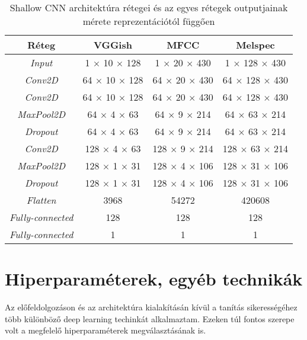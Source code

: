 \begin{table}[H]
	\centering
	\begin{tabular}{ | c | c | c | c |}
		\hline
		\textbf{Réteg} & \textbf{VGGish} & \textbf{MFCC} & \textbf{Melspec}  \\
		\hline \hline
		\emph{Input} & 1 $\times$ 10 $\times$ 128 & 1 $\times$ 20 $\times$ 430 & 1 $\times$ 128 $\times$ 430 \\
		\hline
		\emph{Conv2D} & 64 $\times$ 10 $\times$ 128 & 64 $\times$ 20 $\times$ 430 & 64 $\times$ 128 $\times$ 430 \\
		\hline
		\emph{Conv2D} & 64 $\times$ 10 $\times$ 128 & 64 $\times$ 20 $\times$ 430 & 64 $\times$ 128 $\times$ 430 \\
		\hline
		\emph{MaxPool2D} & 64 $\times$ 4 $\times$ 63 & 64 $\times$ 9 $\times$ 214 & 64 $\times$ 63 $\times$ 214 \\
		\hline
		\emph{Dropout} & 64 $\times$ 4 $\times$ 63 & 64 $\times$ 9 $\times$ 214 & 64 $\times$ 63 $\times$ 214 \\
		\hline 
		\emph{Conv2D} & 128 $\times$ 4 $\times$ 63 & 128 $\times$ 9 $\times$ 214 & 128 $\times$ 63 $\times$ 214 \\
		\hline
		\emph{MaxPool2D} & 128 $\times$ 1 $\times$ 31 & 128 $\times$ 4 $\times$ 106 & 128 $\times$ 31 $\times$ 106 \\
		\hline
		\emph{Dropout} & 128 $\times$ 1 $\times$ 31 & 128 $\times$ 4 $\times$ 106 & 128 $\times$ 31 $\times$ 106 \\
		\hline
		\emph{Flatten} & 3968 & 54272 & 420608 \\
		\hline
		\emph{Fully-connected} & 128 & 128 & 128 \\
		\hline
		\emph{Fully-connected} & 1 & 1  & 1 \\
		\hline
	\end{tabular}
	\caption{Shallow CNN architektúra rétegei és az egyes rétegek outputjainak mérete reprezentációtól függően}
	\label{tab:scnn}
\end{table}

\section{Hiperparaméterek, egyéb technikák}

Az előfeldolgozáson és az architektúra kialakításán kívül a tanítás sikerességéhez több különböző deep learning techinkát alkalmaztam. Ezeken túl fontos szerepe volt a megfelelő hiperparaméterek megválasztásának is.

